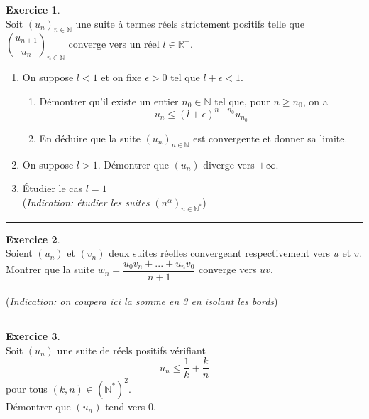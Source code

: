 \documentclass[10pt,a4paper]{article}
\newcommand{\R}{\mathbb{R}}
\newcommand{\N}{\mathbb{N}}
\theoremstyle{definition}
\theoremstyle{definition}
\newtheorem{exo}{Exercice}
\begin{document}
\begin{minipage}{1.0\linewidth}
\begin{minipage}[t]{0.47\linewidth}
\raggedright
\begin{exo}\quad\\
Soit $(u_n)_{n\in\N}$ une suite à termes réels strictement positifs telle que $\left(\dfrac{u_{n+1}}{u_n}\right)_{n\in\N}$ converge vers un réel $l\in\R^+$.
\begin{enumerate}
\item On suppose $l<1$ et on fixe $\epsilon>0$ tel que $l+\epsilon<1$. 
\begin{enumerate}
\item Démontrer qu'il existe un entier $n_0\in\N$ tel que, pour $n\geq n_0$, on a 
$$u_n\leq\left(l+\epsilon\right)^{n-n_0}u_{n_0}$$
\item En déduire que la suite $(u_n)_{n\in\N}$ est convergente et donner sa limite. 


\end{enumerate}
\item  On suppose $l>1$. Démontrer que $(u_n)$ diverge vers $+\infty$.
\item Étudier le cas $l=1$\\
(\textit{Indication: étudier les suites } $(n^\alpha)_{n\in\N^*}$)
\end{enumerate} 
\centering
\rule{1\linewidth}{0.6pt}
\end{exo}

\begin{exo}\quad\\

Soient $(u_n)$ et $(v_n)$ deux suites réelles convergeant respectivement vers $u$ et $v$. Montrer que la suite $w_n=\dfrac{u_0v_n+...+u_nv_0}{n+1}$ converge vers $uv$.\\\hfill\\
(\textit{Indication: on coupera ici la somme en 3 en isolant les bords})

\centering\rule{1\linewidth}{0.6pt}
\end{exo}

\end{minipage}	
\hfill\vrule\hfill
\begin{minipage}[t]{0.47\linewidth}
\raggedright

\begin{exo}\quad\\
Soit $(u_n)$ une suite de réels positifs vérifiant $$u_n\leq \dfrac{1}{k}+\dfrac{k}{n}$$ pour tous $(k,n)\in(\N^*)^2$.\\ Démontrer que $(u_n)$ tend vers $0$.


\end{exo}
\end{minipage}
\end{minipage}
\end{document}
